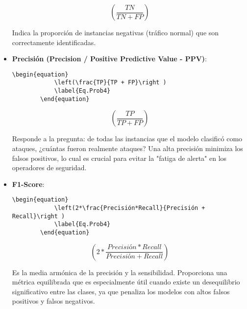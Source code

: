 \begin{itemize}
        \begin{equation}
            \left(\frac{TN}{TN + FP}\right )
            \label{Eq.Prob3}
        \end{equation}
        
     Indica la proporción de instancias negativas (tráfico normal) que son correctamente identificadas.
    
    \item\textbf{Precisión (Precision / Positive Predictive Value - PPV)}: 
        \begin{lstlisting}[language={[LaTeX]TeX},caption={Definición de una ecuación para otro tipo de precisión},label=List.Ecuacion]
        \begin{equation}
            \left(\frac{TP}{TP + FP}\right )
            \label{Eq.Prob4}
        \end{equation}
        \end{lstlisting}

        \begin{equation}
            \left(\frac{TP}{TP + FP}\right )
            \label{Eq.Prob4}
        \end{equation}

     Responde a la pregunta: de todas las instancias que el modelo clasificó como ataques, ¿cuántas fueron realmente ataques? Una alta precisión minimiza los falsos positivos, lo cual es crucial para evitar la "fatiga de alerta" en los operadores de seguridad.
    
    \item\textbf{F1-Score}:
        \begin{lstlisting}[language={[LaTeX]TeX},caption={Definición de una ecuación para la f1-score},label=List.Ecuacion]
        \begin{equation}
            \left(2*\frac{Precisión*Recall}{Precisión + Recall}\right )
            \label{Eq.Prob4}
        \end{equation}
        \end{lstlisting}

         \begin{equation}
            \left(2*\frac{Precisión*Recall}{Precisión + Recall}\right )
            \label{Eq.Prob4}
        \end{equation}
    

     Es la media armónica de la precisión y la sensibilidad. Proporciona una métrica equilibrada que es especialmente útil cuando existe un desequilibrio significativo entre las clases, ya que penaliza los modelos con altos falsos positivos y falsos negativos.
    

\end{itemize}
